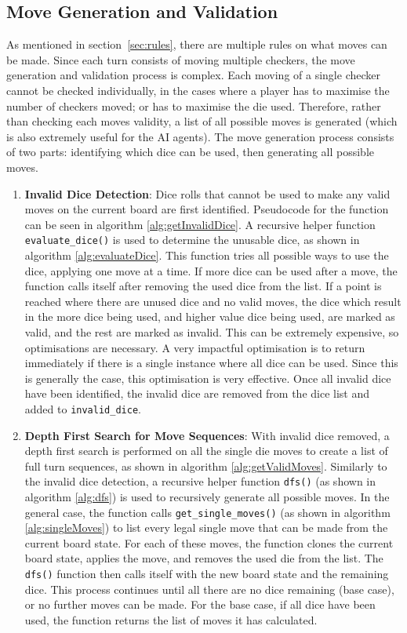 \subsection{Move Generation and Validation}
As mentioned in section~\ref{sec:rules}, there are multiple rules on what moves can be made. Since each turn consists of moving multiple checkers, the move generation and validation process is complex. Each moving of a single checker cannot be checked individually, in the cases where a player has to maximise the number of checkers moved; or has to maximise the die used. Therefore, rather than checking each moves validity, a list of all possible moves is generated (which is also extremely useful for the AI agents).
The move generation process consists of two parts: identifying which dice can be used, then generating all possible moves.
\begin{enumerate}
    \item \textbf{Invalid Dice Detection}: Dice rolls that cannot be used to make any valid moves on the current board are first identified. Pseudocode for the function can be seen in algorithm \ref{alg:getInvalidDice}. A recursive helper function \texttt{evaluate\_dice()} is used to determine the unusable dice, as shown in algorithm \ref{alg:evaluateDice}. This function tries all possible ways to use the dice, applying one move at a time. If more dice can be used after a move, the function calls itself after removing the used dice from the list. If a point is reached where there are unused dice and no valid moves, the dice which result in the more dice being used, and higher value dice being used, are marked as valid, and the rest are marked as invalid. This can be extremely expensive, so optimisations are necessary. A very impactful optimisation is to return immediately if there is a single instance where all dice can be used. Since this is generally the case, this optimisation is very effective. 
    Once all invalid dice have been identified, the invalid dice are removed from the dice list and added to \texttt{invalid\_dice}.

    \item \textbf{Depth First Search for Move Sequences}: With invalid dice removed, a depth first search is performed on all the single die moves to create a list of full turn sequences, as shown in algorithm \ref{alg:getValidMoves}. Similarly to the invalid dice detection, a recursive helper function \texttt{dfs()} (as shown in algorithm \ref{alg:dfs}) is used to recursively generate all possible moves. In the general case, the function calls \texttt{get\_single\_moves()} (as shown in algorithm \ref{alg:singleMoves}) to list every legal single move that can be made from the current board state. For each of these moves, the function clones the current board state, applies the move, and removes the used die from the list. The \texttt{dfs()} function then calls itself with the new board state and the remaining dice. This process continues until all there are no dice remaining (base case), or no further moves can be made. For the base case, if all dice have been used, the function returns the list of moves it has calculated.
\end{enumerate}

